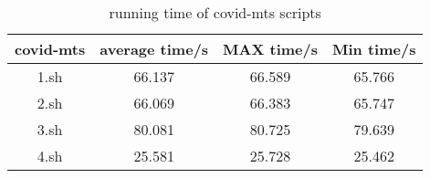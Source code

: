 \documentclass[sigplan, screen, 10pt]{acmart}
\begin{document}
\begin{table}[]
    \centering
    \begin{tabular}{c|c|c|c}
         \textbf{covid-mts}& \textbf{average time/s} & \textbf{MAX time/s} & \textbf{Min time/s} \\
         \hline
         1.sh & 66.137 & 66.589 & 65.766 \\
         2.sh & 66.069 & 66.383 & 65.747\\
         3.sh & 80.081 & 80.725 & 79.639 \\
         4.sh & 25.581 & 25.728 & 25.462 \\
         \hline
    \end{tabular}
    \caption{running time of covid-mts scripts}
\end{table}
\end{document}
